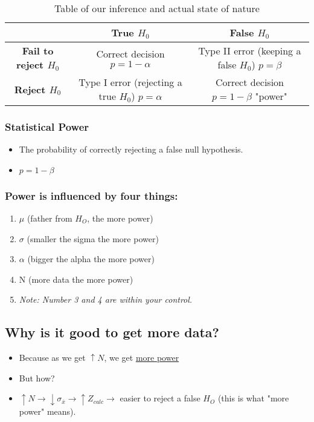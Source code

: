 \documentclass[11pt]{report}
\begin{document}
\begin{table}
    \centering
    \begin{tabular}{|c|c|c|}
        \hline
        & \textbf{True $H_0$} & \textbf{False $H_0$} \\
        \hline
        \textbf{Fail to reject $H_0$} & Correct decision $p = 1 - \alpha$ & Type II error (keeping a false $H_0$) $p = \beta$\\
        \hline
        \textbf{Reject $H_0$} & Type I error (rejecting a true $H_0$) $p = \alpha$ & Correct decision $p = 1 - \beta$ "power" \\
        \hline
    \end{tabular}
    \caption{Table of our inference and actual state of nature}
\end{table}

\subsubsection{Statistical Power}
\begin{itemize}
    \item The probability of correctly rejecting a false null hypothesis. 
    \item $p = 1 - \beta$
\end{itemize}

\subsubsection{Power is influenced by four things:}
\begin{enumerate}
    \item $\mu$ (father from $H_O$, the more power)
    \item $\sigma$ (smaller the sigma the more power) 
    \item $\alpha$ (bigger the alpha the more power)
    \item N (more data the more power) 
    \item \textit{Note: Number 3 and 4 are within your control.}
\end{enumerate}

\subsection{Why is it good to get more data?}
\begin{itemize}
    \item Because as we get $\uparrow N$, we get \underline{more power}
    \item But how? 
    \item $\uparrow N \rightarrow \downarrow \sigma_{\bar{x}} \rightarrow \uparrow Z_{calc} \rightarrow$ easier to reject a false $H_O$ (this is what "more power" means).
\end{itemize}
\end{document}
